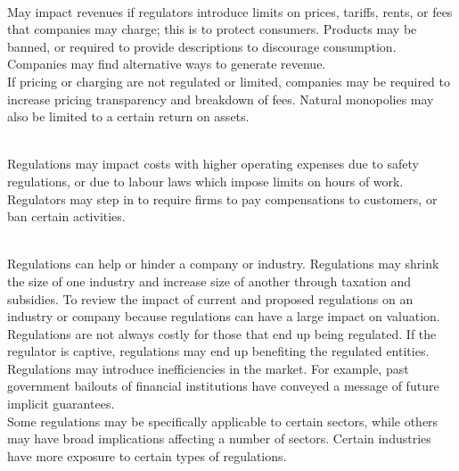 \begin{remark} \\
May impact revenues if regulators introduce limits on prices, tariffs, rents, or fees that companies may charge; this is to protect consumers. Products may be banned, or required to provide descriptions to discourage consumption. Companies may find alternative ways to generate revenue.\\
If pricing or charging are not regulated or limited, companies may be required to increase pricing transparency and breakdown of fees. Natural monopolies may also be limited to a certain return on assets.
\end{remark}

\begin{remark} \\
Regulations may impact costs with higher operating expenses due to safety regulations, or due to labour laws which impose limits on hours of work.\\
Regulators may step in to require firms to pay compensations to customers, or ban certain activities.
\end{remark}

\begin{remark} \\
Regulations can help or hinder a company or industry. Regulations may shrink the size of one industry and increase size of another through taxation and subsidies. To review the impact of current and proposed regulations on an industry or company because regulations can have a large impact on valuation.\\
Regulations are not always costly for those that end up being regulated. If the regulator is captive, regulations may end up benefiting the regulated entities.\\
Regulations may introduce inefficiencies in the market. For example, past government bailouts of financial institutions have conveyed a message of future implicit guarantees.\\
Some regulations may be specifically applicable to certain sectors, while others may have broad implications affecting a number of sectors. Certain industries have more exposure to certain types of regulations. 
\end{remark}